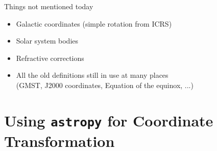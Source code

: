 \documentclass[aspectratio=1610, 9pt]{beamer}
\begin{document}
\begin{frame}{Things not mentioned today}
  \begin{itemize}
    \item Galactic coordinates (simple rotation from ICRS)
    \item Solar system bodies
    \item Refractive corrections
    \item All the old definitions still in use at many places \\
      (GMST, J2000 coordinates, Equation of the equinox, ...)
  \end{itemize}
\end{frame}

\section{Using \texttt{astropy} for Coordinate Transformation}
\end{document}
